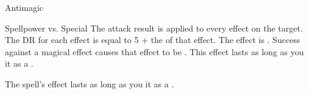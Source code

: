 \begin{spellsection}{Antimagic}
\begin{spellcontent}
\begin{spelltargetinginfo}
\end{spelltargetinginfo}
\begin{spelleffects}
\begin{spellattack}{Spellpower vs. Special}
\spellspecial
The attack result is applied to every  effect on the target.
The DR for each effect is equal to 5 + the  of that effect.
\spellsuccess
The effect is .
Success against a magical effect causes that effect to be .
This effect lasts as long as you  it as a .
\end{spellattack}
\end{spelleffects}
\end{spellcontent}
\begin{spellfooter}
\end{spellfooter}
\begin{spellsubcontent}
\begin{spellcantrip}
The spell's effect lasts as long as you  it as a .
\end{spellcantrip}
\end{spellsubcontent}
\end{spellsection}
